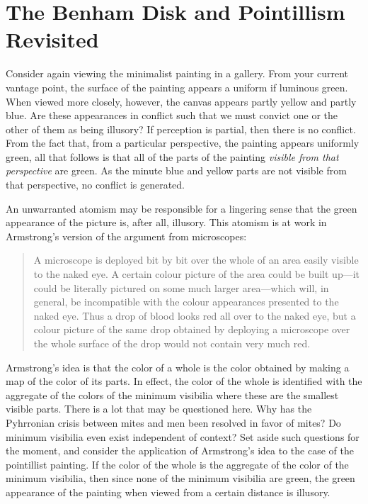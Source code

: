 \documentclass[12pt]{article}
\begin{document}

\section{The Benham Disk and Pointillism Revisited}\label{sub:pointillism_revisited} %

Consider again viewing the minimalist painting in a gallery. From your current vantage point, the surface of the painting appears a uniform if luminous green. When viewed more closely, however, the canvas appears partly yellow and partly blue. Are these appearances in conflict such that we must convict one or the other of them as being illusory? If perception is partial, then there is no conflict. From the fact that, from a particular perspective, the painting appears uniformly green, all that follows is that all of the parts of the painting \emph{visible from that perspective} are green. As the minute blue and yellow parts are not visible from that perspective, no conflict is generated.

An unwarranted atomism may be responsible for a lingering sense that the green appearance of the picture is, after all, illusory. This atomism is at work in Armstrong's version of the argument from microscopes:
	\begin{quote}
		A microscope is deployed bit by bit over the whole of an area easily visible to the naked eye. A certain colour picture of the area could be built up---it could be literally pictured on some much larger area---which will, in general, be incompatible with the colour appearances presented to the naked eye. Thus a drop of blood looks red all over to the naked eye, but a colour picture of the same drop obtained by deploying a microscope over the whole surface of the drop would not contain very much red. \citep[108]{Armstrong:1968nx}
	\end{quote}
Armstrong's idea is that the color of a whole is the color obtained by making a map of the color of its parts. In effect, the color of the whole is identified with the aggregate of the colors of the minimum visibilia where these are the smallest visible parts. There is a lot that may be questioned here. Why has the Pyhrronian crisis between mites and men been resolved in favor of mites? Do minimum visibilia even exist independent of context? Set aside such questions for the moment, and consider the application of Armstrong's idea to the case of the pointillist painting. If the color of the whole is the aggregate of the color of the minimum visibilia, then since none of the minimum visibilia are green, the green appearance of the painting when viewed from a certain distance is illusory.
\end{document}
